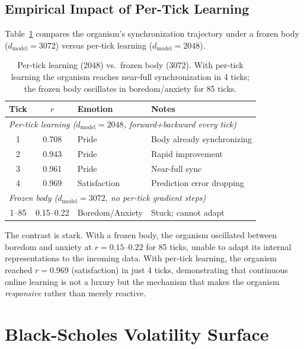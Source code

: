 \documentclass[11pt,a4paper,twocolumn]{article}
\begin{document}
\subsection{Empirical Impact of Per-Tick Learning}

Table~\ref{tab:pertick_results} compares the organism's synchronization trajectory under a frozen body ($d_{\mathrm{model}}=3072$) versus per-tick learning ($d_{\mathrm{model}}=2048$).

\begin{table}[H]
\centering
\caption{Per-tick learning (2048) vs.\ frozen body (3072). With per-tick learning the organism reaches near-full synchronization in 4 ticks; the frozen body oscillates in boredom/anxiety for 85 ticks.}
\label{tab:pertick_results}
\footnotesize
\begin{tabular}{cclp{3.0cm}}
\toprule
Tick & $r$ & Emotion & Notes \\
\midrule
\multicolumn{4}{l}{\textit{Per-tick learning ($d_{\mathrm{model}}=2048$, forward+backward every tick)}} \\
1 & 0.708 & Pride & Body already synchronizing \\
2 & 0.943 & Pride & Rapid improvement \\
3 & 0.961 & Pride & Near-full sync \\
4 & 0.969 & Satisfaction & Prediction error dropping \\
\midrule
\multicolumn{4}{l}{\textit{Frozen body ($d_{\mathrm{model}}=3072$, no per-tick gradient steps)}} \\
1--85 & 0.15--0.22 & Boredom/Anxiety & Stuck; cannot adapt \\
\bottomrule
\end{tabular}
\end{table}

The contrast is stark.
With a frozen body, the organism oscillated between boredom and anxiety at $r=0.15$--$0.22$ for 85 ticks, unable to adapt its internal representations to the incoming data.
With per-tick learning, the organism reached $r=0.969$ (satisfaction) in just 4 ticks, demonstrating that continuous online learning is not a luxury but the mechanism that makes the organism \emph{responsive} rather than merely reactive.

\section{Black-Scholes Volatility Surface}
\label{sec:bs_volatility}
\end{document}
